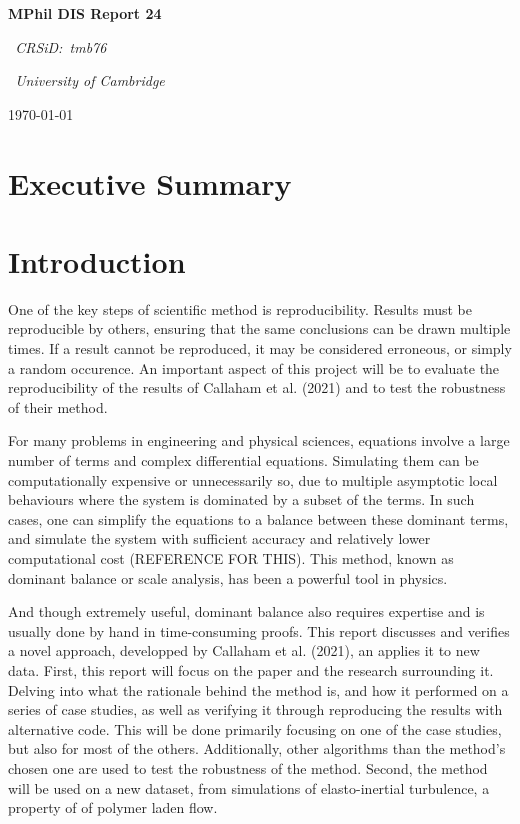 \documentclass[12pt]{report} %
\begin{document}
\begin{titlepage}
  \centering
  \vspace*{2cm}
  {\LARGE\bfseries MPhil DIS Report 24\par}
  \vspace{1cm}
  {\Large\itshape\ CRSiD:\ tmb76\par}
  \vspace{1cm}
  {\Large\itshape\ University of Cambridge\par}
  \vfill
  {\large\today\par}
\end{titlepage}

\tableofcontents

\chapter{Executive Summary}


\chapter{Introduction}


One of the key steps of scientific method is reproducibility. Results must be reproducible by others, ensuring that the same conclusions can be drawn multiple times. If a result cannot be reproduced, it may be considered erroneous, or simply a random occurence. An important aspect of this project will be to evaluate the reproducibility of the results of Callaham et al. (2021)\cite{callaham2021learning} and to test the robustness of their method.

For many problems in engineering and physical sciences, equations involve a large number of terms and complex differential equations. Simulating them can be computationally expensive or unnecessarily so, due to multiple asymptotic local behaviours where the system is dominated by a subset of the terms. In such cases, one can simplify the equations to a balance between these dominant terms, and simulate the system with sufficient accuracy and relatively lower computational cost (REFERENCE FOR THIS). This method, known as dominant balance or scale analysis, has been a powerful tool in physics.

And though extremely useful, dominant balance also requires expertise and is usually done by hand in time-consuming proofs. This report discusses and verifies a novel approach, developped by Callaham et al. (2021)\cite{callaham2021learning}, an applies it to new data. First, this report will focus on the paper and the research surrounding it. Delving into what the rationale behind the method is, and how it performed on a series of case studies, as well as verifying it through reproducing the results with alternative code. This will be done primarily focusing on one of the case studies, but also for most of the others. Additionally, other algorithms than the method's chosen one are used to test the robustness of the method. Second, the method will be used on a new dataset, from simulations of elasto-inertial turbulence, a property of of polymer laden flow.
\end{document}
